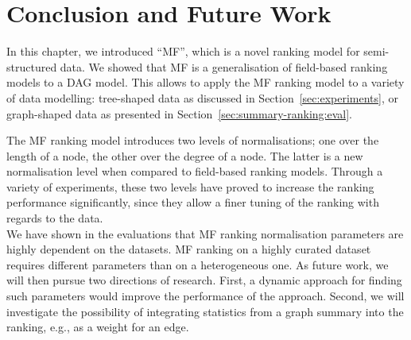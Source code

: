 \section{Conclusion and Future Work}

In this chapter, we introduced ``MF'', which is a novel ranking model for semi-structured data. We showed that \gls{MF} is a generalisation of \gls{field}-based ranking models to a DAG model. This allows to apply the \gls{MF} ranking model to a variety of data modelling: tree-shaped data as discussed in Section~\ref{sec:experiments}, or graph-shaped data as presented in Section~\ref{sec:summary-ranking:eval}.

The \gls{MF} ranking model introduces two levels of normalisations; one over the length of a node, the other over the degree of a node. The latter is a new normalisation level when compared to field-based ranking models. Through a variety of experiments, these two levels have proved to increase the ranking performance significantly, since they allow a finer tuning of the ranking with regards to the data.\\

We have shown in the evaluations that \gls{MF} ranking normalisation parameters are highly dependent on the datasets. \gls{MF} ranking on a highly curated dataset requires different parameters than on a heterogeneous one. As future work, we will then pursue two directions of research. First, a dynamic approach for finding such parameters would improve the performance of the approach. Second, we will investigate the possibility of integrating statistics from a graph summary into the ranking, e.g., as a weight for an edge.
